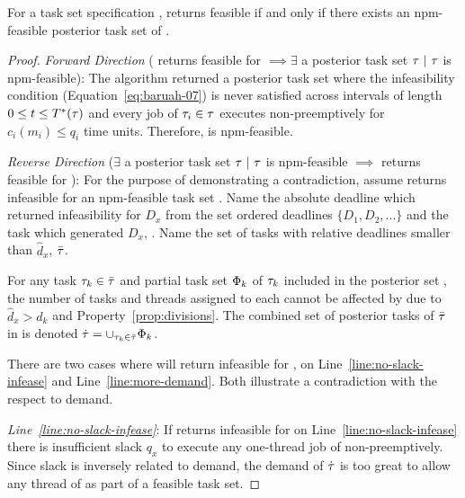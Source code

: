 \documentclass[a4paper,UKenglish,cleveref,autoref,english]{lipics-v2019}
\begin{document}
\setcounter{theorem}{\value{__lastdef}}
\setcounter{theorem}{\value{__lasttheorem}}
\begin{theorem}
  \label{thm:tpj-optimal}
  For a task set specification \ants{}, \tpj{} returns feasible if and
  only if there exists an npm-feasible posterior task set \tasks{} of
  \ants{}.

  \begin{proof}
    \emph{Forward Direction} (\tpj{} returns feasible for \ants{}
    ${\implies \exists}$ a posterior task set ${\tau{}~|~\tau{}}$
    is npm-feasible): The \tpj{} algorithm returned a 
    posterior task set \tasks{} where the infeasibility condition
    (Equation~\ref{eq:baruah-07}) is never satisfied across intervals
    of length ${0 \le t \le T^*(\tau{})}$ and every job of
    ${\tau_{i} \in \tau{}}$ executes non-preemptively for ${c_i(m_i)
      \le q_i}$ time units. Therefore, \tasks{} is npm-feasible. 

    \emph{Reverse Direction} (${\exists}$ a posterior task set
    ${\tau{}~|~\tau{}}$ is npm-feasible ${\implies}$ \tpj{}
    returns feasible for \ants{}): For the purpose of demonstrating a
    contradiction, assume \tpj{} returns infeasible for an
    npm-feasible task set \ants{}. Name the absolute deadline which
    \tpj{} returned infeasibility for ${D_x}$ from the set
    ordered deadlines ${\{D_1, D_2, ... \}}$ and the task which
    generated ${D_x}$, . Name the set of tasks with relative
    deadlines smaller than ${\hat{d}_x}$, ${\bar{\tau{}}}$. 

    For any task ${\tau_{k} \in \bar{\tau{}}}$ and partial task set
    ${\Phi_{k}}$ of ${\tau_{k}}$ included in the posterior set
    \tasks{}, the number of tasks and threads assigned to each
     cannot be affected by  due to
    ${\hat{d}_x > d_k}$ and Property~\ref{prop:divisions}. The
    combined set of posterior tasks of ${\bar{\tau{}}}$ in \tasks{}
    is denoted
    ${\dot{\tau} = \cup_{\tau_{k} \in \bar{\tau{}}} \Phi_{k}}$.
    
    There are two cases where \tpj{} will return infeasible for
    \ants{}, on Line~\ref{line:no-slack-infease} and
    Line~\ref{line:more-demand}. Both illustrate a contradiction with 
    the respect to demand.

    \emph{Line~\ref{line:no-slack-infease}}: If \tpj{} returns
    infeasible for \ants{} on Line~\ref{line:no-slack-infease} there is
    insufficient slack ${q_x}$ to execute any one-thread job of
     non-preemptively. Since slack is inversely related to
    demand, the demand of ${\dot{\tau{}}}$ is too great to allow any
    thread of  as part of a feasible task set.


\end{proof}
\end{theorem}
\end{document}
